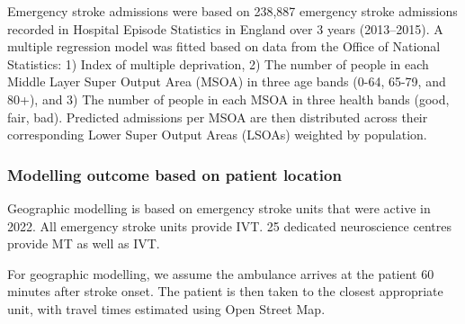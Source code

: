Emergency stroke admissions were based on 238,887 emergency stroke admissions recorded in Hospital Episode Statistics in England over 3 years (2013–2015). A multiple regression model was fitted based on data from the Office of National Statistics: 1) Index of multiple deprivation, 2) The number of people in each Middle Layer Super Output Area (MSOA) in three age bands (0-64, 65-79, and 80+), and 3) The number of people in each MSOA in three health bands (good, fair, bad). Predicted admissions per MSOA are then distributed across their corresponding Lower Super Output Areas (LSOAs) weighted by population.

\subsubsection{Modelling outcome based on patient location}

Geographic modelling is based on emergency stroke units that were active in 2022. All emergency stroke units provide IVT. 25 dedicated neuroscience centres provide MT as well as IVT.

For geographic modelling, we assume the ambulance arrives at the patient 60 minutes after stroke onset. The patient is then taken to the closest appropriate unit, with travel times estimated using Open Street Map.

